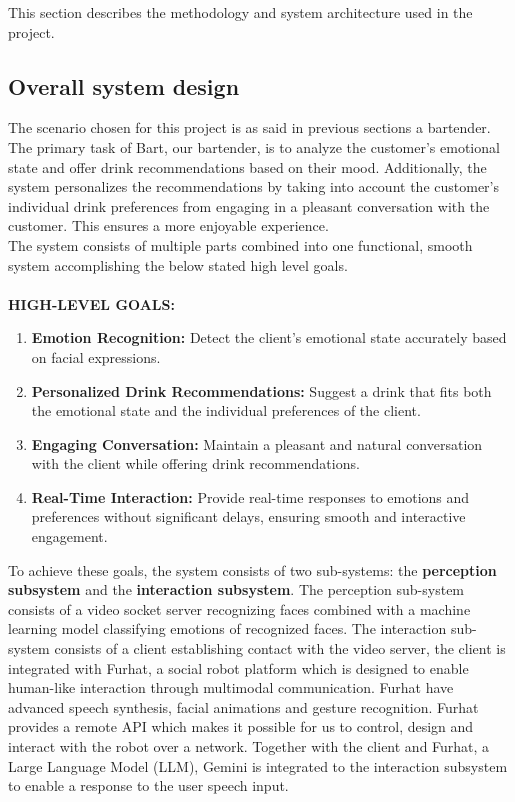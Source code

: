 \documentclass[conference]{IEEEtran}
\begin{document}
This section describes the methodology and system architecture used in the project.

\subsection{Overall system design}\label{sec:overallsysdesg}



The scenario chosen for this project is as said in previous sections a bartender. The primary task of Bart, our bartender, is to analyze the customer's emotional state and offer drink recommendations based on their mood. Additionally, the system personalizes the recommendations by taking into account the customer's individual drink preferences from engaging in a pleasant conversation with the customer. This ensures a more enjoyable experience.\\The system consists of multiple parts combined into one functional, smooth system accomplishing the below stated high level goals.\\
\\
\textbf{HIGH-LEVEL GOALS:}
\\
\begin{enumerate}
    \item \textbf{Emotion Recognition:} Detect the client’s emotional state accurately based on facial expressions.
    \item \textbf{Personalized Drink Recommendations:} Suggest a drink that fits both the emotional state and the individual preferences of the client.
    \item \textbf{Engaging Conversation:} Maintain a pleasant and natural conversation with the client while offering drink recommendations.
    \item \textbf{Real-Time Interaction:} Provide real-time responses to emotions and preferences without significant delays, ensuring smooth and interactive engagement.\\
\end{enumerate}
To achieve these goals, the system consists of two sub-systems: the \textbf{perception subsystem} and the \textbf{interaction subsystem}. The perception sub-system consists of a video socket server recognizing faces combined with a machine learning model classifying emotions of recognized faces. The interaction sub-system consists of a client establishing contact with the video server, the client is integrated with Furhat, a social robot platform which is designed to enable human-like interaction through multimodal communication. Furhat have advanced speech synthesis, facial animations and gesture recognition. Furhat provides a remote API which makes it possible for us to control, design and interact with the robot over a network. Together with the client and Furhat, a Large Language Model (LLM), Gemini is integrated to the interaction subsystem to enable a response to the user speech input.\\
\end{document}
